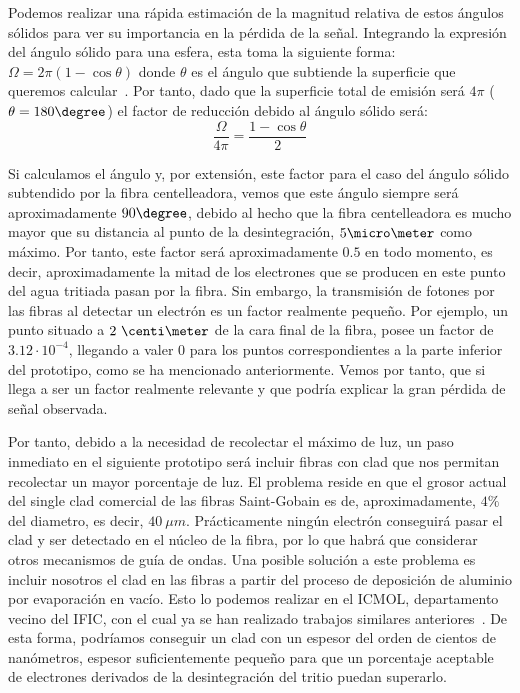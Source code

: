 Podemos realizar una rápida estimación de la magnitud relativa de estos ángulos sólidos para ver su importancia en la pérdida de la señal. Integrando la expresión del ángulo sólido para una esfera, esta toma la siguiente forma: $\Omega=2\pi(1-\cos{\theta})$ donde $\theta$ es el ángulo que subtiende la superficie que queremos calcular~\cite{unizar}. Por tanto, dado que la superficie total de emisión será $4\pi$ ($\theta=180\degree$) el factor de reducción debido al ángulo sólido será:
\begin{equation}
\frac{\Omega}{4\pi}=\frac{1-\cos{\theta}}{2}
\label{factordebidoalangulosolido}
\end{equation}

Si  calculamos el ángulo y, por extensión, este factor para el caso del ángulo sólido subtendido por la fibra centelleadora, vemos que este ángulo siempre será aproximadamente $90\degree$, debido al hecho que la fibra centelleadora es mucho mayor que su distancia al punto de la desintegración, $5\micro\meter$ como máximo. Por tanto, este factor será aproximadamente $0.5$ en todo momento, es decir, aproximadamente la mitad de los electrones que se producen en este punto del agua tritiada pasan por la fibra. Sin embargo, la transmisión de fotones por las fibras al detectar un electrón es un factor realmente pequeño. Por ejemplo, un punto situado a $2~\centi\meter$ de la cara final de la fibra, posee un factor de $3.12\cdotp 10^{-4}$, llegando a valer $0$ para los puntos correspondientes a la parte inferior del prototipo, como se ha mencionado anteriormente. Vemos por tanto, que si llega a ser un factor realmente relevante y que podría explicar la gran pérdida de señal observada. 

Por tanto, debido a la necesidad de recolectar el máximo de luz, un paso inmediato en el siguiente prototipo será incluir fibras con clad que nos permitan recolectar un mayor porcentaje de luz. El problema reside en que el grosor actual del single clad comercial de las fibras Saint-Gobain es de, aproximadamente, $4\%$ del diametro, es decir, $40~\mu m$. Prácticamente ningún electrón conseguirá pasar el clad y ser detectado en el núcleo de la fibra, por lo que habrá que considerar otros mecanismos de guía de ondas. Una posible solución a este problema es incluir nosotros el clad en las fibras a partir del proceso de deposición de aluminio por evaporación en vacío. Esto lo podemos realizar en el ICMOL, departamento vecino del IFIC, con el cual ya se han realizado trabajos similares anteriores~\cite{cladtesis,cladarticulo}. De esta forma, podríamos conseguir un clad con un espesor del orden de cientos de nanómetros, espesor suficientemente pequeño para que un porcentaje aceptable de electrones derivados de la desintegración del tritio puedan superarlo. 

